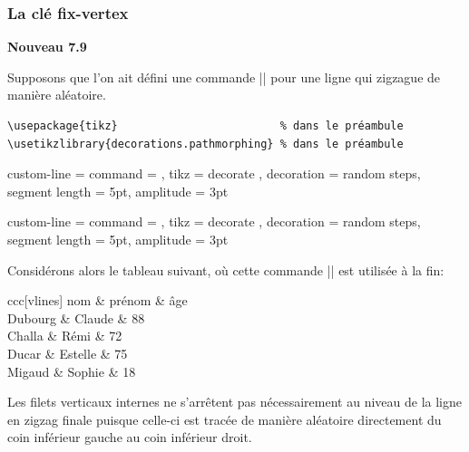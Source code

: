 \documentclass[dvipsnames]{article}
\begin{document}


\subsubsection{La clé fix-vertex}


\colorbox{yellow!50}{\bfseries Nouveau 7.9}

\nobreak
\smallskip
Supposons que l'on ait défini une commande |\RandomLine| pour une ligne qui zigzague de
manière aléatoire.


\bigskip
\begin{Verbatim}[formatcom = \footnotesize \color{gray}]
\usepackage{tikz}                         % dans le préambule
\usetikzlibrary{decorations.pathmorphing} % dans le préambule
\end{Verbatim}

\medskip
\begin{footnotesize}
\begin{Code}
\NiceMatrixOptions
  {
    custom-line =
     {
       command = \emph{\RandomLine} ,
       tikz =
         {
           decorate ,
           decoration = { random steps, segment length = 5pt, amplitude = 3pt } 
         }
     }
  }
\end{Code}
\end{footnotesize}

\NiceMatrixOptions
  {
    custom-line =
     {
       command = \RandomLine ,
       tikz =
         {
           decorate ,
           decoration = { random steps, segment length = 5pt, amplitude = 3pt } 
         }
     }
  }

\goodbreak
\medskip
Considérons alors le tableau suivant, où cette commande |\RandomLine| est utilisée à la fin:

\medskip
{}
\begin{Code}[width=9.5cm,show-output]
\begin{NiceTabular}{ccc}[vlines]
\Hline
nom & prénom & âge \\
\Hline
Dubourg & Claude & 88 \\
Challa & Rémi & 72 \\
Ducar & Estelle & 75 \\
Migaud & Sophie & 18 \\[1mm]
\emph{\RandomLine}
\end{NiceTabular}
\end{Code}

\goodbreak
\bigskip
Les filets verticaux internes ne s'arrêtent pas nécessairement au niveau de la
ligne en zigzag finale puisque celle-ci est tracée de manière aléatoire
directement du coin inférieur gauche au coin inférieur droit.
\end{document}
